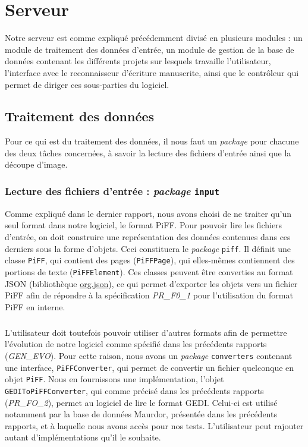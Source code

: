 \chapter{Serveur}

Notre serveur est comme expliqué précédemment divisé en plusieurs modules : un module de traitement des données d'entrée, un module de gestion de la base de données contenant les différents projets sur lesquels travaille l'utilisateur, l'interface avec le reconnaisseur d'écriture manuscrite, ainsi que le contrôleur qui permet de diriger ces sous-parties du logiciel.

\section{Traitement des données}

Pour ce qui est du traitement des données, il nous faut un \textit{package} pour chacune des deux tâches concernées, à savoir la lecture des fichiers d'entrée ainsi que la découpe d'image.

\subsection{Lecture des fichiers d'entrée : \textit{package} \texttt{input}}

Comme expliqué dans le dernier rapport, nous avons choisi de ne traiter qu'un seul format dans notre logiciel, le format PiFF. Pour pouvoir lire les fichiers d'entrée, on doit construire une représentation des données contenues dans ces derniers sous la forme d'objets. Ceci constituera le \textit{package} \texttt{piff}. Il définit une classe \texttt{PiFF}, qui contient des pages (\texttt{PiFFPage}), qui elles-mêmes contiennent des portions de texte (\texttt{PiFFElement}). Ces classes peuvent être converties au format JSON (bibliothèque \href{https://mvnrepository.com/artifact/org.json/json}{org.json}), ce qui permet d'exporter les objets vers un fichier PiFF afin de répondre à la spécification \textit{PR\_F0\_1} pour l'utilisation du format PiFF en interne.

\paragraph{}
L'utilisateur doit toutefois pouvoir utiliser d'autres formats afin de permettre l'évolution de notre logiciel comme spécifié dans les précédents rapports (\textit{GEN\_EVO}). Pour cette raison, nous avons un \textit{package} \texttt{converters} contenant une interface, \texttt{PiFFConverter}, qui permet de convertir un fichier quelconque en objet \texttt{PiFF}. Nous en fournissons une implémentation, l'objet \texttt{GEDIToPiFFConverter}, qui comme précisé dans les précédents rapports (\textit{PR\_FO\_2}), permet au logiciel de lire le format GEDI. Celui-ci est utilisé notamment par la base de données Maurdor, présentée dans les précédents rapports, et à laquelle nous avons accès pour nos tests. L'utilisateur peut rajouter autant d'implémentations qu'il le souhaite.

